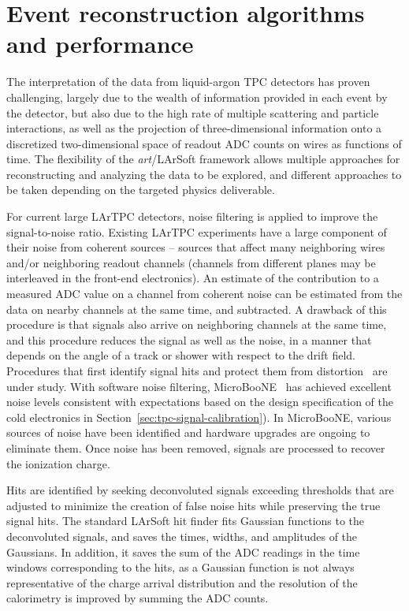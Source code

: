 \section{Event reconstruction algorithms and performance}
\label{sec:larsoftreco}

The interpretation of the data from liquid-argon TPC detectors has
proven challenging, largely due to the wealth of information provided
in each event by the detector, but also due to the high rate of
multiple scattering and particle interactions, as well as the
projection of three-dimensional information onto a discretized
two-dimensional space of readout ADC counts on wires as functions of
time.  The flexibility of the {\textit{art}}/LArSoft framework allows
multiple approaches for reconstructing and analyzing the data to be
explored, and different approaches to be taken depending on the targeted
physics deliverable.


For current large LArTPC detectors, noise filtering is applied to improve
the signal-to-noise ratio.  Existing LArTPC experiments have a
large component of their noise from coherent sources -- sources that
affect many neighboring wires and/or neighboring readout channels
(channels from different planes may be interleaved in the front-end
electronics).  An estimate of the contribution to a measured ADC value on a channel from
coherent noise can be estimated from the data on nearby channels at the same time, and subtracted.
A drawback of this procedure is that signals also arrive on neighboring
channels at the same time, and this procedure reduces the signal as
well as the noise, in a manner that depends on the angle of a track or
shower with respect to the drift field.  Procedures that first
identify signal hits and protect them from distortion~\cite{Mooney:2015kke} 
are under study. With software noise filtering, MicroBooNE~\cite{noise_filter}
has achieved excellent noise levels consistent with expectations based on 
the design specification of the cold electronics %
in Section~\ref{sec:tpc-signal-calibration}).  In MicroBooNE, various 
sources of noise have been identified and hardware upgrades 
are ongoing to eliminate them.   Once noise has been removed,
signals are processed to recover the ionization charge.

Hits are identified by seeking deconvoluted signals exceeding
thresholds that are adjusted to minimize the creation of false noise
hits while preserving the true signal hits.  The standard LArSoft hit
finder fits Gaussian functions to the deconvoluted signals, and saves the
times, widths, and amplitudes of the Gaussians.  In addition, it saves the sum of
the ADC readings in the time windows corresponding to the hits, as a
Gaussian function is not always representative of the charge arrival
distribution and the resolution of the calorimetry is improved by
summing the ADC counts.

